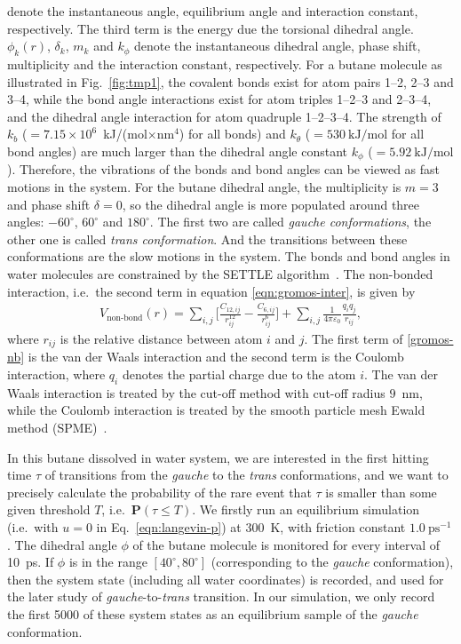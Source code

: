 \documentclass[final]{siamltex}
\newcommand{\bP}{{\mathbf P}}
\begin{document}
denote the instantaneous angle, equilibrium angle and interaction
constant, respectively. The third term is the energy due the torsional
dihedral angle.  $\phi_k(r)$, $\delta_k$, $m_k$ and $k_\phi$ denote
the instantaneous dihedral angle, phase shift, multiplicity and the
interaction constant, respectively. For a butane molecule as illustrated in Fig.~\ref{fig:tmp1}, the covalent bonds exist for atom pairs 1--2,
2--3 and 3--4, while the bond angle interactions exist for atom triples
1--2--3 and 2--3--4, and the dihedral angle interaction for atom
quadruple 1--2--3--4. The strength of $k_b$ ($=7.15\times
10^6$~\textrm{kJ/(mol$\times$nm$^4$)} for all bonds) and $k_\theta$
($=530~\textrm{kJ/mol}$ for all bond angles) are much larger
than the dihedral angle constant $k_\phi$ ($=5.92~\textrm{kJ/mol}$).
Therefore, the vibrations of the bonds and bond angles  can
be viewed as fast motions in the system. For the butane dihedral angle,
the multiplicity is $m=3$ and phase shift $\delta = 0$, so the
dihedral angle is more populated around three angles: $-60^\circ$,
$60^\circ$ and $180^\circ$. The first two are called
\emph{gauche conformations}, the other one is called
\emph{trans conformation}. And the transitions between these
conformations are the slow motions in the system. The bonds and bond angles
in water molecules are constrained by the SETTLE
algorithm~\cite{miyamoto2004settle}.  The non-bonded interaction,
i.e.~the second term in equation \eqref{eqn:gromos-inter}, is
given by
\begin{align}\label{gromos-nb}
  V_{\textrm{non-bond}}(r) =
  \sum_{i,j} \bigg[\frac{C_{12,ij}}{r_{ij}^{12}} - \frac{C_{6,ij}}{r_{ij}^{6}}\bigg]
  +
  \sum_{i,j}\frac{1}{4\pi\varepsilon_0} \frac{q_i q_j}{ r_{ij}},
\end{align}
where $r_{ij}$ is the relative distance between atom $i$ and $j$. The
first term of \eqref{gromos-nb} is the van der Waals interaction
and the second term is the Coulomb interaction, where $q_i$ denotes the
partial charge due to the atom $i$. The van der Waals interaction is
treated by the cut-off method with cut-off radius $9$~nm, while the Coulomb
interaction is treated by the smooth particle mesh Ewald
method (SPME)~\cite{essmann1995spm}.

In this butane dissolved in water system, we are interested in the
first hitting time $\tau$ of transitions from the \emph{gauche} to the
\emph{trans}
conformations, and we want to precisely calculate the probability of the rare
event that $\tau$ is smaller than some given threshold $T$,
i.e.~$\bP(\tau \leq T)$. We firstly run an equilibrium simulation
(i.e.~with $u = 0$ in Eq.~\eqref{eqn:langevin-p}) at 300~K, with
friction constant $1.0~\textrm{ps}^{-1}$.  The dihedral angle $\phi$ of the
butane molecule is monitored for every interval of 10~ps. If $\phi$ is in the range
$[40^\circ, 80^\circ]$ (corresponding to the \emph{gauche} conformation), then
the system state (including all water coordinates) is recorded, and
used for the later study of \emph{gauche}-to-\emph{trans} transition. In our
simulation, we only record the first 5000 of these system states as an
equilibrium sample of the \emph{gauche} conformation.
\end{document}
